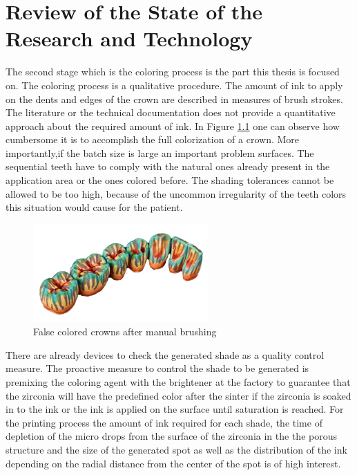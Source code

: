 \chapter{Review of the State of the Research and Technology}
\label{sec:kritik_stand_technik}
The second stage which is the coloring process is the part this thesis is focused on. The coloring process is a qualitative procedure. The amount of ink to apply on the dents and edges of the crown are described in measures of brush strokes. The literature or the technical documentation does not provide a quantitative approach about the required amount of ink. In Figure \ref{fig:false_colored} one can observe how cumbersome it is to accomplish the full colorization of a crown. More importantly,if the batch size is large an important problem surfaces. The sequential teeth have to comply with the natural ones already present in the application area or the ones colored before. The shading tolerances cannot be allowed to be too high, because of the uncommon irregularity of the teeth colors this situation would cause for the patient. 
\newline
\begin{figure}[h]
	\centering
	\includegraphics[width=0.6\textwidth]{grafiken/false_colored.png}
	\caption{False colored crowns after manual brushing \citep{zirkonzahn2018}}
	\label{fig:false_colored}
\end{figure}
\newline

There are already devices to check the generated shade as a quality control measure. The proactive measure to control the shade to be generated is premixing the coloring agent with the brightener at the factory to guarantee that the zirconia will have the predefined color after the sinter if the zirconia is soaked in to the ink or the ink is applied on the surface until saturation is reached.
For the printing process the amount of ink required for each shade, the time of depletion of the micro drops from the surface of the zirconia in the the porous structure and the size of the generated spot as well as the distribution of the ink depending on the radial distance from the center of the spot is of high interest.